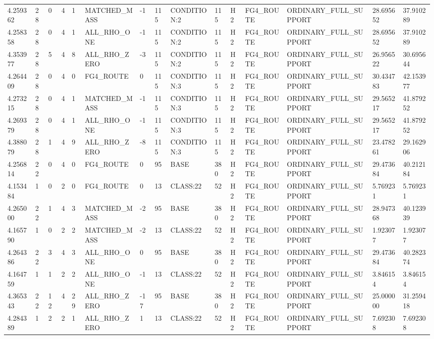 \begin{tabular}{lllllllllllllll}
4.259362 & 28 & 0 & 4 & 1 & MATCHED\_MASS & -1 & 115 & CONDITION:2 & 115 & H2 & FG4\_ROUTE & ORDINARY\_FULL\_SUPPORT & 28.695652 & 37.910289 \\
4.258358 & 28 & 0 & 4 & 1 & ALL\_RHO\_ONE & -1 & 115 & CONDITION:2 & 115 & H2 & FG4\_ROUTE & ORDINARY\_FULL\_SUPPORT & 28.695652 & 37.910289 \\
4.353977 & 28 & 5 & 4 & 8 & ALL\_RHO\_ZERO & -3 & 115 & CONDITION:2 & 115 & H2 & FG4\_ROUTE & ORDINARY\_FULL\_SUPPORT & 26.956522 & 30.695644 \\
4.264409 & 28 & 0 & 4 & 0 & FG4\_ROUTE & 0 & 115 & CONDITION:3 & 115 & H2 & FG4\_ROUTE & ORDINARY\_FULL\_SUPPORT & 30.434783 & 42.153977 \\
4.273215 & 28 & 0 & 4 & 1 & MATCHED\_MASS & -1 & 115 & CONDITION:3 & 115 & H2 & FG4\_ROUTE & ORDINARY\_FULL\_SUPPORT & 29.565217 & 41.879252 \\
4.269379 & 28 & 0 & 4 & 1 & ALL\_RHO\_ONE & -1 & 115 & CONDITION:3 & 115 & H2 & FG4\_ROUTE & ORDINARY\_FULL\_SUPPORT & 29.565217 & 41.879252 \\
4.388079 & 28 & 1 & 4 & 9 & ALL\_RHO\_ZERO & -8 & 115 & CONDITION:3 & 115 & H2 & FG4\_ROUTE & ORDINARY\_FULL\_SUPPORT & 23.478261 & 29.162906 \\
4.256814 & 22 & 0 & 4 & 0 & FG4\_ROUTE & 0 & 95 & BASE & 380 & H2 & FG4\_ROUTE & ORDINARY\_FULL\_SUPPORT & 29.473684 & 40.212184 \\
4.153484 & 1 & 0 & 2 & 0 & FG4\_ROUTE & 0 & 13 & CLASS:22 & 52 & H2 & FG4\_ROUTE & ORDINARY\_FULL\_SUPPORT & 5.769231 & 5.769231 \\
4.265000 & 22 & 1 & 4 & 3 & MATCHED\_MASS & -2 & 95 & BASE & 380 & H2 & FG4\_ROUTE & ORDINARY\_FULL\_SUPPORT & 28.947368 & 40.123939 \\
4.165790 & 1 & 0 & 2 & 2 & MATCHED\_MASS & -2 & 13 & CLASS:22 & 52 & H2 & FG4\_ROUTE & ORDINARY\_FULL\_SUPPORT & 1.923077 & 1.923077 \\
4.264386 & 22 & 3 & 4 & 3 & ALL\_RHO\_ONE & 0 & 95 & BASE & 380 & H2 & FG4\_ROUTE & ORDINARY\_FULL\_SUPPORT & 29.473684 & 40.282374 \\
4.164759 & 1 & 1 & 2 & 2 & ALL\_RHO\_ONE & -1 & 13 & CLASS:22 & 52 & H2 & FG4\_ROUTE & ORDINARY\_FULL\_SUPPORT & 3.846154 & 3.846154 \\
4.365343 & 22 & 12 & 4 & 29 & ALL\_RHO\_ZERO & -17 & 95 & BASE & 380 & H2 & FG4\_ROUTE & ORDINARY\_FULL\_SUPPORT & 25.000000 & 31.259418 \\
4.284389 & 1 & 2 & 2 & 1 & ALL\_RHO\_ZERO & 1 & 13 & CLASS:22 & 52 & H2 & FG4\_ROUTE & ORDINARY\_FULL\_SUPPORT & 7.692308 & 7.692308 \\

\end{tabular}
